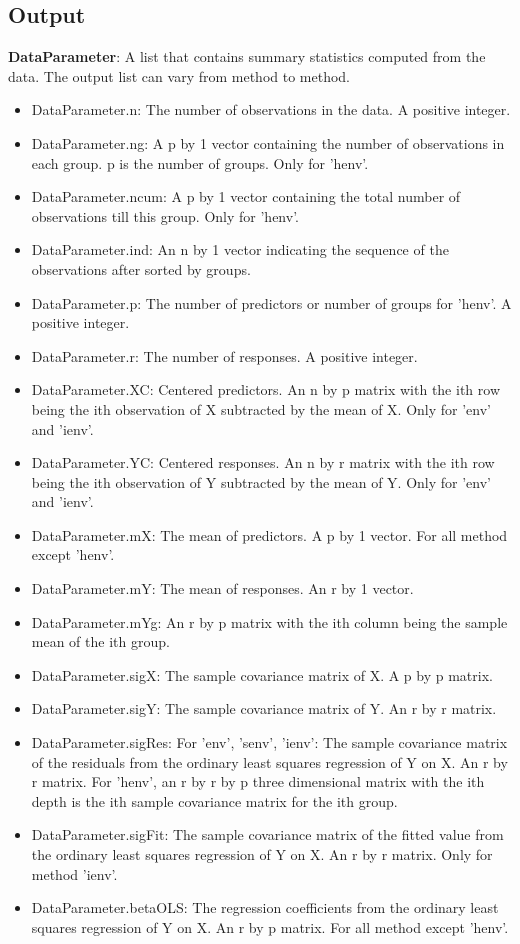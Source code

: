 \documentclass[a4paper,11pt,openany]{memoir}
\begin{document}
\subsection*{Output}

\begin{par}
\textbf{DataParameter}: A list that contains summary statistics computed from the data.  The output list can vary from method to method.
\end{par} \vspace{1em}
\begin{itemize}
\setlength{\itemsep}{-1ex}
   \item DataParameter.n: The number of observations in the data.  A positive integer.
   \item DataParameter.ng: A p by 1 vector containing the number of observations in each group.  p is the number of groups.  Only for 'henv'.
   \item DataParameter.ncum: A p by 1 vector containing the total number of observations till this group.  Only for 'henv'.
   \item DataParameter.ind: An n by 1 vector indicating the sequence of the observations after sorted by groups.
   \item DataParameter.p: The number of predictors or number of groups for 'henv'.  A positive integer.
   \item DataParameter.r: The number of responses.  A positive integer.
   \item DataParameter.XC: Centered predictors.  An n by p matrix with the ith row being the ith observation of X subtracted by the mean of X.  Only for 'env' and 'ienv'.
   \item DataParameter.YC: Centered responses.  An n by r matrix with the ith row being the ith observation of Y subtracted by the mean of Y.  Only for 'env' and 'ienv'.
   \item DataParameter.mX: The mean of predictors.  A p by 1 vector.  For all method except 'henv'.
   \item DataParameter.mY: The mean of responses.  An r by 1 vector.
   \item DataParameter.mYg: An r by p matrix with the ith column being the sample mean of the ith group.
   \item DataParameter.sigX: The sample covariance matrix of X.  A p by p matrix.
   \item DataParameter.sigY: The sample covariance matrix of Y.  An r by r matrix.
   \item DataParameter.sigRes: For 'env', 'senv', 'ienv': The sample covariance matrix of the residuals from the ordinary least squares regression of Y on X.  An r by r matrix. For 'henv', an r by r by p three dimensional matrix with the ith depth is the ith sample covariance matrix for the ith group.
   \item DataParameter.sigFit: The sample covariance matrix of the fitted value from the ordinary least squares regression of Y on X.  An r by r matrix. Only for method 'ienv'.
   \item DataParameter.betaOLS: The regression coefficients from the ordinary least squares regression of Y on X.  An r by p matrix.  For all method except 'henv'.
\end{itemize}
\end{document}
